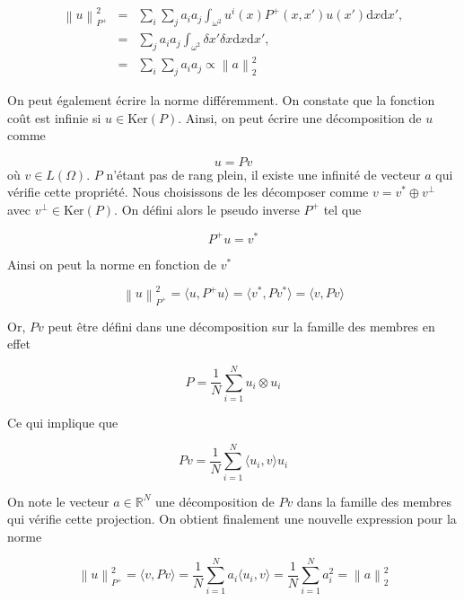 \documentclass{article}
\newcommand{\norm}[1]{\left\lVert #1 \right\rVert}
\begin{document}
\begin{eqnarray*}
    \norm{u}^2_{P^+} &=& \sum_i \sum_j a_i a_j \int_{\omega^2} u^i(x) P^+(x, x') u(x') \mathrm{d}x\mathrm{d}x', \\
    &=& \sum_j a_i a_j \int_{\omega^2} \delta{x'} \delta{x}\mathrm{d}x\mathrm{d}x', \\
    &=& \sum_i \sum_j a_i a_j \propto \norm{a}_2^2
\end{eqnarray*}

On peut également écrire la norme différemment. On constate que la fonction coût est infinie si $u \in \text{Ker} (P)$. Ainsi, on peut écrire une décomposition de $u$ comme

\begin{equation*}
    u = P v
\end{equation*} où $v \in L(\Omega)$. $P$ n'étant pas de rang plein, il existe une infinité de vecteur $a$ qui vérifie cette propriété. Nous choisissons de les décomposer comme $v = v^* \oplus v^\perp$ avec $v^\perp \in \text{Ker}(P)$. On défini alors le pseudo inverse $P^+$ tel que

\begin{equation*}
    P^+ u = v^*
\end{equation*}

Ainsi on peut la norme en fonction de $v^*$

\begin{equation*}
    \norm{u}^2_{P^+} = \langle u, P^+ u \rangle = \langle v^*, P v^* \rangle = \langle v, P v \rangle
\end{equation*}

Or, $P v$ peut être défini dans une décomposition sur la famille des membres en effet

\begin{equation*}
    P = \frac1N \sum_{i=1}^N u_i \otimes u_i
\end{equation*}

Ce qui implique que

\begin{equation*}
    P v = \frac1N \sum_{i=1}^N \langle u_i, v \rangle u_i
\end{equation*}

On note le vecteur $a \in \mathbb{R}^N$ une décomposition de $Pv$ dans la famille des membres qui vérifie cette projection. On obtient finalement une nouvelle expression pour la norme

\begin{equation}
    \norm{u}^2_{P^+} = \langle v, P v \rangle = \frac1N \sum_{i=1}^N a_i \langle u_i, v\rangle = \frac1N \sum_{i=1}^N a_i^2 = \norm{a}^2_2
\end{equation}
\end{document}
